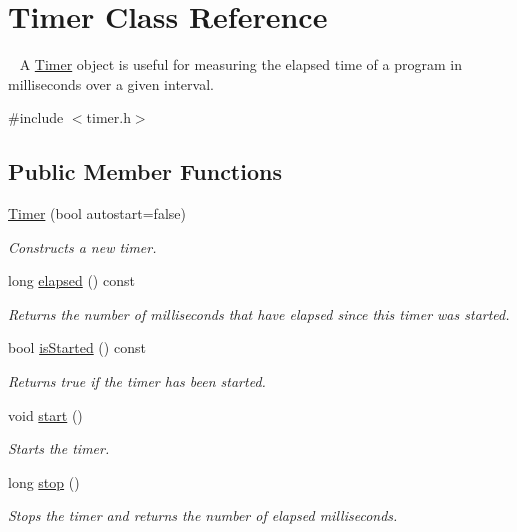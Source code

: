 \hypertarget{classTimer}{}\section{Timer Class Reference}
\label{classTimer}


~\newline
 A \mbox{\hyperlink{classTimer}{Timer}} object is useful for measuring the elapsed time of a program in milliseconds over a given interval.  




{\ttfamily \#include $<$timer.\+h$>$}

\subsection*{Public Member Functions}
\begin{DoxyCompactItemize}
\item 
\mbox{\hyperlink{classTimer_a706556016b105bfe8459770ee1540dd9}{Timer}} (bool autostart=false)
\begin{DoxyCompactList}\small\item\em Constructs a new timer. \end{DoxyCompactList}\item 
long \mbox{\hyperlink{classTimer_a4c3fc68815831690cadc2f7cc65890fb}{elapsed}} () const
\begin{DoxyCompactList}\small\item\em Returns the number of milliseconds that have elapsed since this timer was started. \end{DoxyCompactList}\item 
bool \mbox{\hyperlink{classTimer_ac1991ea0e286fbb461b60c8c9299d781}{is\+Started}} () const
\begin{DoxyCompactList}\small\item\em Returns true if the timer has been started. \end{DoxyCompactList}\item 
void \mbox{\hyperlink{classTimer_a60de64d75454385b23995437f1d72669}{start}} ()
\begin{DoxyCompactList}\small\item\em Starts the timer. \end{DoxyCompactList}\item 
long \mbox{\hyperlink{classTimer_aeaafdf74a35ee2a5308e0b421f87b6a5}{stop}} ()
\begin{DoxyCompactList}\small\item\em Stops the timer and returns the number of elapsed milliseconds. \end{DoxyCompactList}\end{DoxyCompactItemize}
